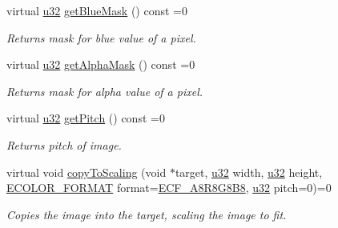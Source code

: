 \begin{DoxyCompactItemize}
\mbox{\label{classirr_1_1video_1_1IImage_a3554ed18eb6e79213f6330d19006e9e8}} 
virtual \hyperlink{namespaceirr_a0416a53257075833e7002efd0a18e804}{u32} \hyperlink{classirr_1_1video_1_1IImage_a3554ed18eb6e79213f6330d19006e9e8}{get\+Blue\+Mask} () const =0
\begin{DoxyCompactList}\small\item\em Returns mask for blue value of a pixel. \end{DoxyCompactList}\item 
\mbox{\label{classirr_1_1video_1_1IImage_a36d4f895245543080f24f99dd89930fb}} 
virtual \hyperlink{namespaceirr_a0416a53257075833e7002efd0a18e804}{u32} \hyperlink{classirr_1_1video_1_1IImage_a36d4f895245543080f24f99dd89930fb}{get\+Alpha\+Mask} () const =0
\begin{DoxyCompactList}\small\item\em Returns mask for alpha value of a pixel. \end{DoxyCompactList}\item 
\mbox{\label{classirr_1_1video_1_1IImage_aace497c2d12f217a795a546a735e2675}} 
virtual \hyperlink{namespaceirr_a0416a53257075833e7002efd0a18e804}{u32} \hyperlink{classirr_1_1video_1_1IImage_aace497c2d12f217a795a546a735e2675}{get\+Pitch} () const =0
\begin{DoxyCompactList}\small\item\em Returns pitch of image. \end{DoxyCompactList}\item 
\mbox{\label{classirr_1_1video_1_1IImage_a6f57153218f5ecd4da9aeb5a37f92f59}} 
virtual void \hyperlink{classirr_1_1video_1_1IImage_a6f57153218f5ecd4da9aeb5a37f92f59}{copy\+To\+Scaling} (void $\ast$target, \hyperlink{namespaceirr_a0416a53257075833e7002efd0a18e804}{u32} width, \hyperlink{namespaceirr_a0416a53257075833e7002efd0a18e804}{u32} height, \hyperlink{namespaceirr_1_1video_a1d5e487888c32b1674a8f75116d829ed}{E\+C\+O\+L\+O\+R\+\_\+\+F\+O\+R\+M\+AT} format=\hyperlink{namespaceirr_1_1video_a1d5e487888c32b1674a8f75116d829edac3d45e946a56d11bd43dc18661dfe7ec}{E\+C\+F\+\_\+\+A8\+R8\+G8\+B8}, \hyperlink{namespaceirr_a0416a53257075833e7002efd0a18e804}{u32} pitch=0)=0
\begin{DoxyCompactList}\small\item\em Copies the image into the target, scaling the image to fit. \end{DoxyCompactList}\item 

\end{DoxyCompactItemize}
